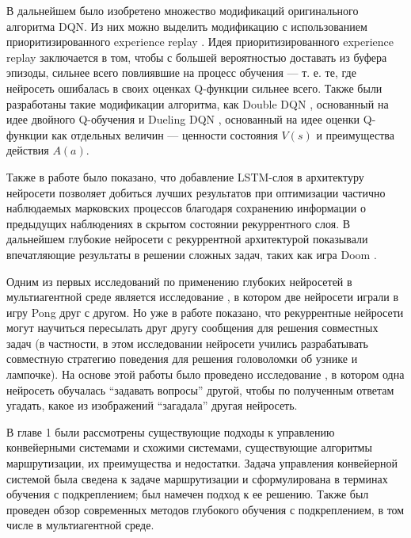 \documentclass[specification,annotation,times]{itmo-student-thesis}
\theoremstyle{definition}
\begin{document}
В дальнейшем было изобретено множество модификаций оригинального алгоритма DQN.
Из них можно выделить модификацию с использованием приоритизированного
experience replay \cite{schaul2015prioritized}. Идея приоритизированного
experience replay заключается в том, чтобы с большей вероятностью доставать из
буфера эпизоды, сильнее всего повлиявшие на процесс обучения --- т. е. те,
где нейросеть ошибалась в своих оценках Q-функции сильнее всего.
Также были разработаны такие модификации алгоритма, как Double
DQN \cite{van2016deep}, основанный на идее двойного
Q-обучения \cite{hasselt2010double} и Dueling DQN \cite{wang2015dueling},
основанный на идее оценки Q-функции как отдельных величин --- ценности состояния
$V(s)$ и преимущества действия $A(a)$.

Также в работе \cite{hausknecht2015deep} было показано, что добавление
LSTM-слоя \cite{hochreiter1997long} в архитектуру нейросети позволяет добиться
лучших результатов при оптимизации частично наблюдаемых марковских процессов
благодаря сохранению информации о предыдущих наблюдениях в скрытом состоянии
рекуррентного слоя. В дальнейшем глубокие нейросети с рекуррентной архитектурой
показывали впечатляющие результаты в решении сложных задач, таких как игра
Doom \cite{lample2016playing}.

Одним из первых исследований по применению глубоких нейросетей в мультиагентной
среде является исследование \cite{tampuu2017multiagent}, в котором две нейросети
играли в игру Pong друг с другом. Но уже в работе \cite{foerster2016learning}
показано, что рекуррентные нейросети могут научиться пересылать друг другу сообщения для решения
совместных задач (в частности, в этом исследовании нейросети учились
разрабатывать совместную стратегию поведения для решения головоломки об узнике и
лампочке). На основе этой работы было проведено исследование
\cite{jorge2016learning}, в котором одна нейросеть обучалась
\enquote{задавать вопросы} другой, чтобы по полученным ответам угадать, какое из
изображений \enquote{загадала} другая нейросеть.

\chapterconclusion

В главе 1 были рассмотрены существующие подходы к управлению конвейерными
системами и схожими системами, существующие алгоритмы маршрутизации, их преимущества
и недостатки. Задача управления конвейерной системой была сведена к задаче
маршрутизации и сформулирована в терминах обучения с подкреплением; был намечен
подход к ее решению. Также был проведен обзор современных методов глубокого
обучения с подкреплением, в том числе в мультиагентной среде.
\end{document}
